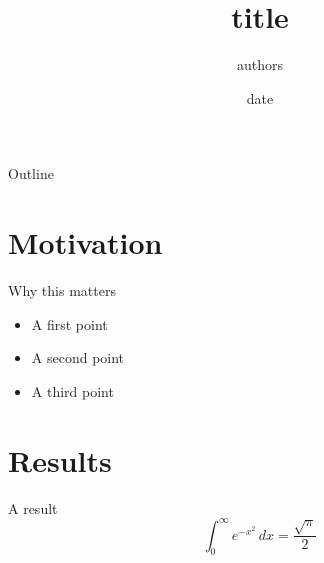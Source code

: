 \documentclass[aspectratio=169]{beamer}
\title{{{title}}}
\author{{{authors}}}
\institute{{{affiliations}}}
\date{{{date}}}
\begin{document}
\begin{frame}
  \titlepage
\end{frame}

\begin{frame}{Outline}
  \tableofcontents
\end{frame}

\section{Motivation}
\begin{frame}{Why this matters}
  \begin{itemize}
    \item A first point
    \item A second point
    \item A third point
  \end{itemize}
\end{frame}

\section{Results}
\begin{frame}{A result}
  \[ \int_0^\infty e^{-x^2}\,dx = \frac{\sqrt{\pi}}{2} \]
\end{frame}
\end{document}

